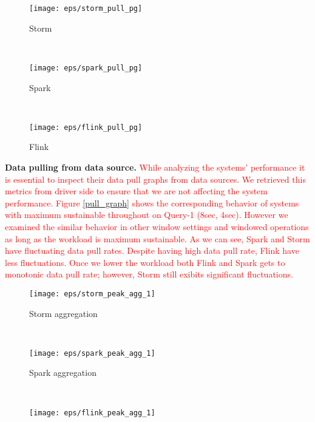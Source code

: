 {\begin{figure*}
	\centering
	
	\begin{subfigure}[b]{0.3\textwidth}
		\texttt{[image: eps/storm\_pull\_pg]}
		
		
		\caption{Storm }
	\end{subfigure}
	~ 
	\begin{subfigure}[b]{0.3\textwidth}
		\texttt{[image: eps/spark\_pull\_pg]}
		
		
		\caption{ Spark }
	\end{subfigure}
	~ 
	\begin{subfigure}[b]{0.3\textwidth}
		\texttt{[image: eps/flink\_pull\_pg]}
		
		
		\caption{ Flink }
	\end{subfigure}
	
	\caption{\textcolor{red}{Data pull graphs of systems}}
	\label{pull_graph}
\end{figure*}




\textbf{Data pulling from data source.}
\textcolor{red}{While analyzing the systems' performance it is essential to inspect their data pull graphs from data sources. We retrieved this metrics from driver side to ensure that we are not affecting the system performance. Figure \ref{pull_graph} shows the corresponding behavior of systems with maximum sustainable throughout on Query-1 (8sec, 4sec). However we examined the similar behavior in other window settings and windowed operations as long as the workload is maximum sustainable.  As we can see, Spark and Storm have fluctuating data pull rates. Despite having high data pull rate, Flink have less fluctuations. Once we lower the workload both Flink and Spark gets to monotonic data pull rate; however, Storm still exibits significant fluctuations. }



\begin{figure*}
	\centering
	
	\begin{subfigure}[b]{0.3\textwidth}
		\texttt{[image: eps/storm\_peak\_agg\_1]}
		
		
		\caption{Storm aggregation }
	\end{subfigure}
	~ 
	\begin{subfigure}[b]{0.3\textwidth}
		\texttt{[image: eps/spark\_peak\_agg\_1]}
		
		
		\caption{ Spark aggregation }
	\end{subfigure}
	~ 
	\begin{subfigure}[b]{0.3\textwidth}
		\texttt{[image: eps/flink\_peak\_agg\_1]}
		

\end{subfigure}
\end{figure*}}
